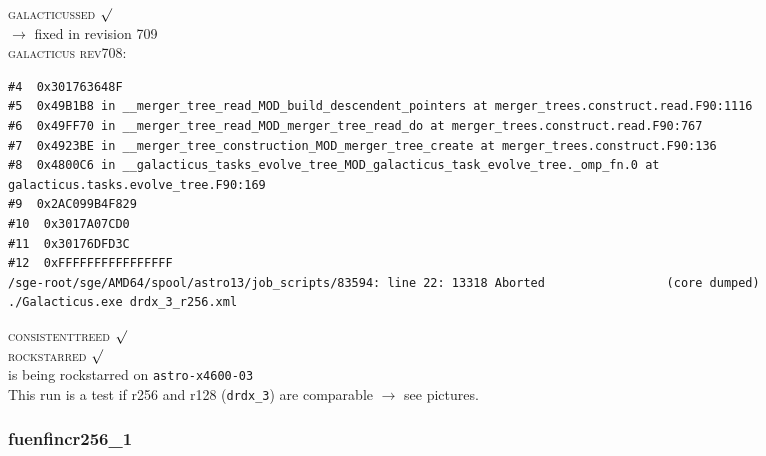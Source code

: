 \textsc{galacticussed} $\surd$ \\
$\rightarrow$ fixed in revision 709 \\

\textsc{galacticus rev708:} \\
\begin{verbatim}
#4  0x301763648F
#5  0x49B1B8 in __merger_tree_read_MOD_build_descendent_pointers at merger_trees.construct.read.F90:1116
#6  0x49FF70 in __merger_tree_read_MOD_merger_tree_read_do at merger_trees.construct.read.F90:767
#7  0x4923BE in __merger_tree_construction_MOD_merger_tree_create at merger_trees.construct.F90:136
#8  0x4800C6 in __galacticus_tasks_evolve_tree_MOD_galacticus_task_evolve_tree._omp_fn.0 at galacticus.tasks.evolve_tree.F90:169
#9  0x2AC099B4F829
#10  0x3017A07CD0
#11  0x30176DFD3C
#12  0xFFFFFFFFFFFFFFFF
/sge-root/sge/AMD64/spool/astro13/job_scripts/83594: line 22: 13318 Aborted                 (core dumped) ./Galacticus.exe drdx_3_r256.xml
\end{verbatim}
\textsc{consistenttreed} $\surd$ \\
\textsc{rockstarred} $\surd$ \\
is being rockstarred on \texttt{astro-x4600-03} \\
This run is a test if r256 and r128 (\texttt{drdx\_3}) 
are comparable $\rightarrow$ see pictures. \\
	
% 
%
%
%
%
%
%
%


\newpage
\subsubsection{fuenfincr256\_1}

